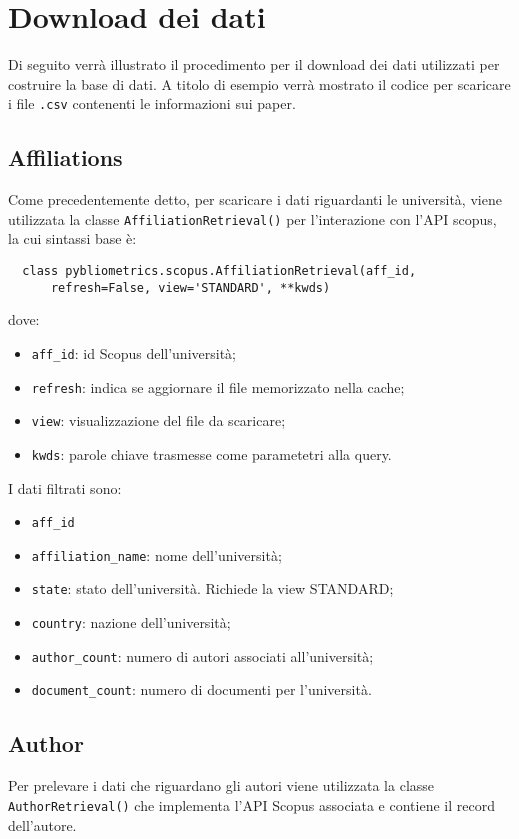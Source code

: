 \section{Download dei dati}
\label{download}

Di seguito verrà illustrato il procedimento per il download dei dati utilizzati per costruire la base di dati. A titolo di esempio verrà mostrato il codice 
per scaricare i file \texttt{.csv} contenenti le informazioni sui paper. 

\subsection{Affiliations}
Come precedentemente detto, per scaricare i dati riguardanti le università, viene utilizzata la classe \texttt{AffiliationRetrieval()} per l'interazione 
con l'API scopus, la cui sintassi base è:
\begin{lstlisting}
  class pybliometrics.scopus.AffiliationRetrieval(aff_id, 
      refresh=False, view='STANDARD', **kwds)
\end{lstlisting}

dove:
\begin{itemize}
  \item \texttt{aff\_id}: id Scopus dell'università;
  \item \texttt{refresh}: indica se aggiornare il file memorizzato nella cache;
  \item \texttt{view}: visualizzazione del file da scaricare;
  \item \texttt{kwds}: parole chiave trasmesse come parametetri alla query.
\end{itemize}

I dati filtrati sono:
\begin{itemize}
  \item \texttt{aff\_id}
  \item \texttt{affiliation\_name}: nome dell'università;
  \item \texttt{state}: stato dell'università. Richiede la view STANDARD;
  \item \texttt{country}: nazione dell'università;
  \item \texttt{author\_count}: numero di autori associati all'università;
  \item \texttt{document\_count}: numero di documenti per l'università.
\end{itemize}

\subsection{Author}
Per prelevare i dati che riguardano gli autori viene utilizzata la classe \texttt{AuthorRetrieval()} che implementa l'API Scopus associata e contiene il record 
dell'autore. 

